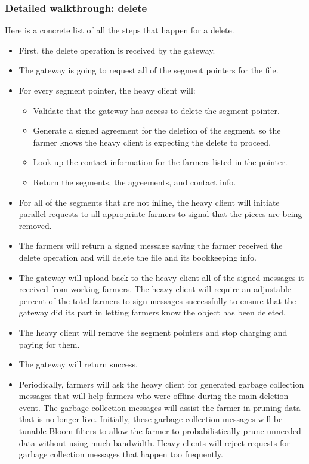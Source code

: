 \documentclass[a4paper,10pt]{article} \usepackage[utf8]{inputenc}
\begin{document}
\subsubsection{Detailed walkthrough: delete}

Here is a concrete list of all the steps that happen for a delete.

\begin{itemize}
\item First, the delete operation is received by the gateway.
\item The gateway is going to request all of the segment pointers for the file.
\item For every segment pointer, the heavy client will:
  \begin{itemize}
  \item Validate that the gateway has access to delete the segment pointer.
  \item Generate a signed agreement for the deletion of the segment, so the
    farmer knows the heavy client is expecting the delete to proceed.
  \item Look up the contact information for the farmers listed in the pointer.
  \item Return the segments, the agreements, and contact info.
  \end{itemize}
\item For all of the segments that are not inline, the heavy client will
  initiate parallel requests to all appropriate farmers to signal that the
  pieces are being removed.
\item The farmers will return a signed message saying the farmer received the
  delete operation and will delete the file and its bookkeeping info.
\item The gateway will upload back to the heavy client all of the signed
  messages it received from working farmers. The heavy client will require an
  adjustable percent of the total farmers to sign messages successfully
  to ensure that the gateway did its part in letting farmers know the object
  has been deleted.
\item The heavy client will remove the segment pointers and stop charging and
  paying for them.
\item The gateway will return success.
\item Periodically, farmers will ask the heavy client for generated garbage
  collection messages that will help farmers who were offline during the main
  deletion event.
  The garbage collection messages will assist the farmer in pruning data that is
  no longer live. Initially, these garbage collection messages will be tunable
  Bloom filters to allow the farmer to probabilistically prune unneeded data
  without using much bandwidth.
  Heavy clients will reject requests for garbage collection messages that
  happen too frequently.
\end{itemize}
\end{document}
